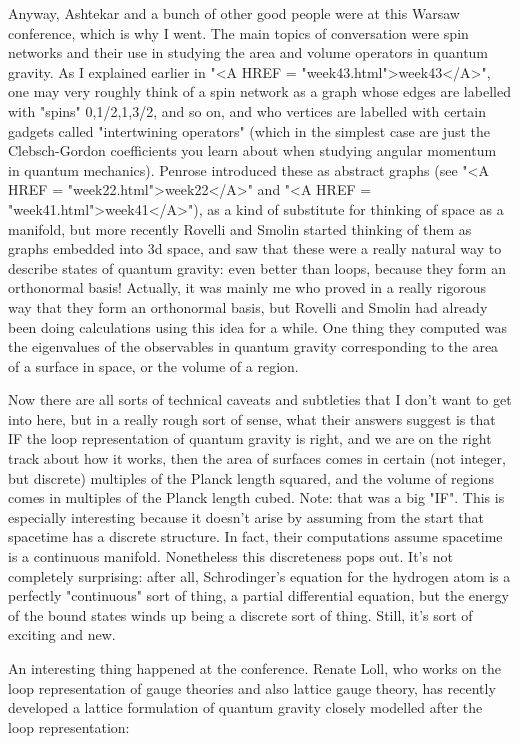 Anyway, Ashtekar and a bunch of other good people were at this Warsaw 
conference, which is why I went.  The main topics of conversation were 
spin networks and their use in studying the area and volume operators in
quantum gravity.  As I explained earlier in "<A HREF = "week43.html">week43</A>", one may very roughly 
think of a spin network as a graph whose edges are labelled with "spins" 
0,1/2,1,3/2, and so on, and who vertices are labelled with certain gadgets 
called "intertwining operators" (which in the simplest case are just the 
Clebsch-Gordon coefficients you learn about when studying angular momentum 
in quantum mechanics).  Penrose introduced these as abstract graphs (see
"<A HREF = "week22.html">week22</A>" and "<A HREF = "week41.html">week41</A>"), as a kind of substitute for thinking of space as a 
manifold, but more recently Rovelli and Smolin started thinking of them 
as graphs embedded into 3d space, and saw that these were a really natural 
way to describe states of quantum gravity: even better than loops, because 
they form an orthonormal basis!  Actually, it was mainly me who proved 
in a really rigorous way that they form an orthonormal basis, but 
Rovelli and Smolin had already been doing calculations using this idea 
for a while.  One thing they computed was the eigenvalues of the 
observables in quantum gravity corresponding to the area of a 
surface in space, or the volume of a region.  

Now there are all sorts of technical caveats and subtleties that I don't 
want to get into here, but in a really rough sort of sense, what their 
answers suggest is that IF the loop representation of quantum gravity is right,
and we are on the right track about how it works, then the area of surfaces 
comes in certain (not integer, but discrete) multiples of the Planck length 
squared, and the volume of regions comes in multiples of the Planck length 
cubed.  Note: that was a big "IF".  This is especially interesting because it
doesn't arise by assuming from the start that spacetime has a discrete
structure.  In fact, their computations assume spacetime is a continuous
manifold.  Nonetheless this discreteness pops out.  It's not completely 
surprising: after all, Schrodinger's equation for the hydrogen
atom is a perfectly "continuous" sort of thing, a partial differential equation,
but the energy of the bound states winds up being a discrete sort of thing.
Still, it's sort of exciting and new.

An interesting thing happened at the conference.  Renate Loll, who works on
the loop representation of gauge theories and also lattice gauge theory,
has recently developed a lattice formulation of quantum gravity closely
modelled after the loop representation:

